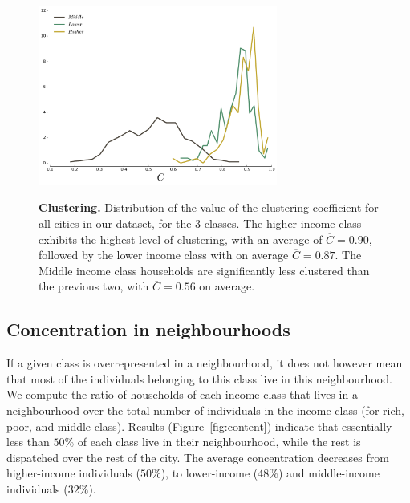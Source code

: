 \begin{figure} 
    \centering
    \includegraphics[width=0.7\textwidth]{gfx/chapter-segregation/clustering.pdf}\\
    \caption{{\bf Clustering.} Distribution of the value of the clustering coefficient for
        all cities in our dataset, for the 3 classes. The higher income class
        exhibits the highest level of clustering, with an average of
        $\overline{C} = 0.90$, followed by the lower income class with on
        average $\overline{C} = 0.87$. The Middle income class households are
        significantly less clustered than the previous two, with $\overline{C} =
        0.56$ on average.} 
        \label{fig:clustering} 
\end{figure}

\subsection{Concentration in neighbourhoods}
\label{sub:concentration_in_neighbourhoods}


If a given class is overrepresented in a neighbourhood, it does not however mean
that most of the individuals belonging to this class live in this neighbourhood.
We compute the ratio of households of each income class that lives in a
neighbourhood over the total number of individuals in the income class (for
rich, poor, and middle class).  Results (Figure~\ref{fig:content}) indicate that
essentially less than $50\%$ of each class live in their neighbourhood, while
the rest is dispatched over the rest of the city. The average concentration
decreases from higher-income individuals ($50\%$), to lower-income ($48\%$) and
middle-income individuals ($32\%$).\\

